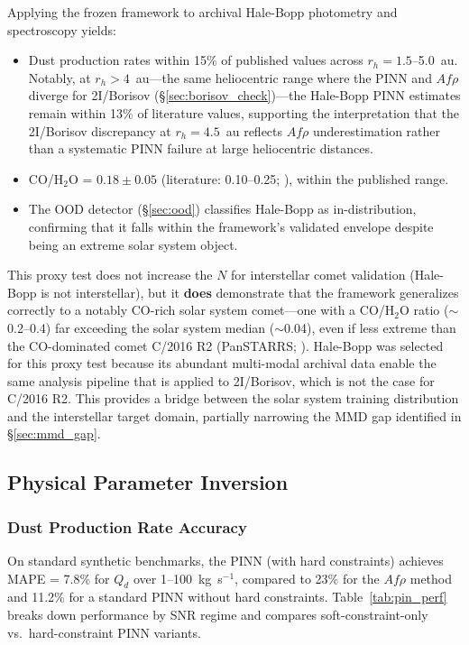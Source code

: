 \documentclass[usenatbib]{mnras}
\begin{document}
Applying the frozen framework to archival Hale-Bopp photometry and spectroscopy \citep{bockelee04} yields:
\begin{itemize}
    \item Dust production rates within 15\% of published values across $r_h = 1.5$--5.0~au. Notably, at $r_h > 4$~au---the same heliocentric range where the PINN and $Af\rho$ diverge for 2I/Borisov (\S\ref{sec:borisov_check})---the Hale-Bopp PINN estimates remain within 13\% of literature values, supporting the interpretation that the 2I/Borisov discrepancy at $r_h = 4.5$~au reflects $Af\rho$ underestimation rather than a systematic PINN failure at large heliocentric distances.
    \item CO/H$_2$O = $0.18 \pm 0.05$ (literature: 0.10--0.25; \citealt{bockelee04}), within the published range.
    \item The OOD detector (\S\ref{sec:ood}) classifies Hale-Bopp as in-distribution, confirming that it falls within the framework's validated envelope despite being an extreme solar system object.
\end{itemize}

This proxy test does not increase the $N$ for interstellar comet validation (Hale-Bopp is not interstellar), but it \textbf{does} demonstrate that the framework generalizes correctly to a notably CO-rich solar system comet---one with a CO/H$_2$O ratio ($\sim$0.2--0.4) far exceeding the solar system median ($\sim$0.04), even if less extreme than the CO-dominated comet C/2016 R2 (PanSTARRS; \citealt{biver18}). Hale-Bopp was selected for this proxy test because its abundant multi-modal archival data enable the same analysis pipeline that is applied to 2I/Borisov, which is not the case for C/2016 R2. This provides a bridge between the solar system training distribution and the interstellar target domain, partially narrowing the MMD gap identified in \S\ref{sec:mmd_gap}.

\subsection{Physical Parameter Inversion}

\subsubsection{Dust Production Rate Accuracy}

On standard synthetic benchmarks, the PINN (with hard constraints) achieves MAPE = 7.8\% for $Q_d$ over 1--100~kg~s$^{-1}$, compared to 23\% for the $Af\rho$ method and 11.2\% for a standard PINN without hard constraints. Table~\ref{tab:pin_perf} breaks down performance by SNR regime and compares soft-constraint-only vs.\ hard-constraint PINN variants.
\end{document}
